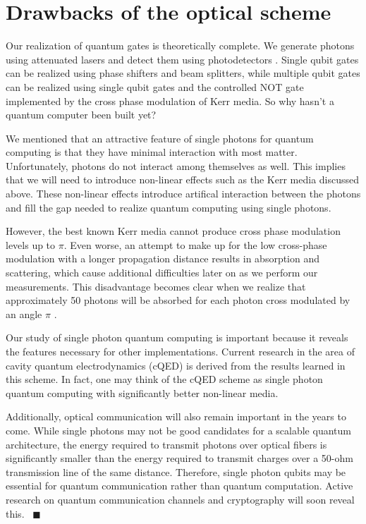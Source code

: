 \section{Drawbacks of the optical scheme}
Our realization of quantum gates is theoretically complete. We generate photons using attenuated lasers and detect them using photodetectors \cite{klm,nielsen2000}. Single qubit gates can be realized using phase shifters and beam splitters, while multiple qubit gates can be realized using single qubit gates and the controlled NOT gate implemented by the cross phase modulation of Kerr media. So why hasn't a quantum computer been built yet?

We mentioned that an attractive feature of single photons for quantum computing is that they have minimal interaction with most matter. Unfortunately, photons do not interact among themselves as well. This implies that we will need to introduce non-linear effects such as the Kerr media discussed above. These non-linear effects introduce artifical interaction between the photons and fill the gap needed to realize quantum computing using single photons. 

However, the best known Kerr media cannot produce cross phase modulation levels up to $\pi$. Even worse, an attempt to make up for the low cross-phase modulation with a longer propagation distance results in absorption and scattering, which cause additional difficulties later on as we perform our measurements. This disadvantage becomes clear when we realize that approximately 50 photons will be absorbed for each photon cross modulated by an angle $\pi$ \cite{nielsen2000}. 

Our study of single photon quantum computing is important because it reveals the features necessary for other implementations. Current research in the area of cavity quantum electrodynamics (cQED) is derived from the results learned in this scheme. In fact, one may think of the cQED scheme as single photon quantum computing with significantly better non-linear media.

Additionally, optical communication will also remain important in the years to come. While single photons may not be good candidates for a scalable quantum architecture, the energy required to transmit photons over optical fibers is significantly smaller than the energy required to transmit charges over a 50-ohm transmission line of the same distance. Therefore, single photon qubits may be essential for quantum communication rather than quantum computation. Active research on quantum communication channels and cryptography will soon reveal this.
~\hfill$\blacksquare$
